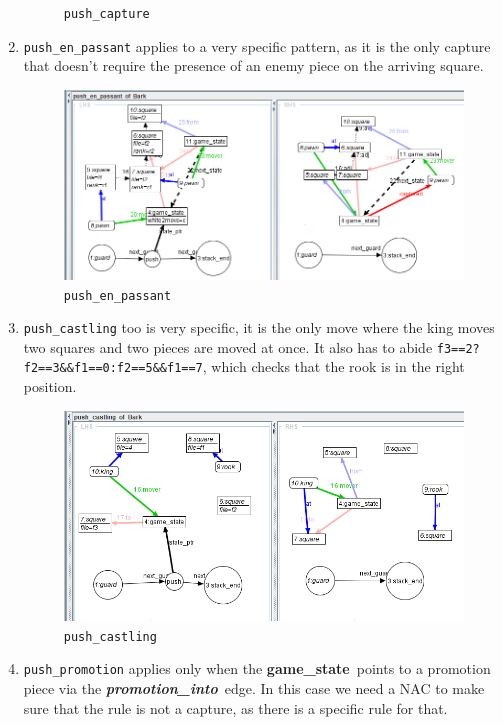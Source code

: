 \documentclass[a4paper, 10pt]{scrartcl}
\newcommand{\noderepr}[1]{\textsf{\textbf{#1}}}
\newcommand{\edgerepr}[1]{\textit{\textbf{#1}}}
\newcommand{\gamestate}{\noderepr{game\_state}}
\newcommand{\promotioninto}{\edgerepr{promotion\_into}}
\begin{document}
\begin{enumerate}
\begin{figure}[H]
            \caption{\texttt{push\_capture}}
        \end{figure}
        \item \texttt{push\_en\_passant} applies to a very specific pattern, as it is the only capture that doesn't require the presence of an enemy piece on the arriving square.
        \begin{figure}[H]
            \centering
            \includegraphics[width=.8\linewidth]{images/push_en_passant.png}
            \caption{\texttt{push\_en\_passant}}
        \end{figure}
        \item \texttt{push\_castling} too is very specific, it is the only move where the king moves two squares and two pieces are moved at once. It also has to abide \texttt{f3==2?f2==3\&\&f1==0:f2==5\&\&f1==7}, which checks that the rook is in the right position.
        \begin{figure}[H]
            \centering
            \includegraphics[width=.8\linewidth]{images/push_castling.png}
            \caption{\texttt{push\_castling}}
        \end{figure}
        \item \texttt{push\_promotion} applies only when the \gamestate\ points to a promotion piece via the \promotioninto\ edge. In this case we need a NAC to make sure that the rule is not a capture, as there is a specific rule for that.
        \begin{figure}[H]
            \centering

\end{figure}
\end{enumerate}
\end{document}
